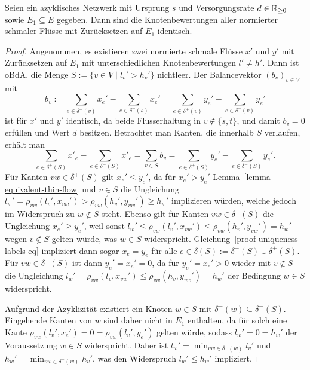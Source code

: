 \begin{lemma}
	Seien ein azyklisches Netzwerk mit Ursprung $s$ und Versorgungsrate $d\in\mathbb{R}_{\geq 0}$ sowie $E_1\subseteq E$ gegeben.
	Dann sind die Knotenbewertungen aller normierter schmaler Flüsse mit Zurücksetzen auf $E_1$ identisch.
\end{lemma}
\begin{proof}
	Angenommen, es existieren zwei normierte schmale Flüsse $x'$ und $y'$ mit Zurück\-setzen auf $E_1$ mit unterschiedlichen Knotenbewertungen $l'\neq h'$.
	Dann ist oBdA. die Menge $S:=\{ v\in V \mid l_v' > h_v' \}$ nichtleer.
	Der Balancevektor $(b_v)_{v\in V}$ mit $$b_v:=\sum_{e\in\delta^+(v)} x_e' - \sum_{e\in\delta^-(s)} x_e' = \sum_{e\in\delta^+(v)} y_e' - \sum_{e\in\delta^-(v)} y_e'$$ ist für $x'$ und $y'$ identisch, da beide Flusserhaltung in $v\notin\{ s, t\}$, und damit $b_v=0$ erfüllen und Wert $d$ besitzen.
	Betrachtet man Kanten, die innerhalb $S$ verlaufen, erhält man 
	\begin{equation}\label{proof-uniqueness-labels-eq}
	\sum_{e\in \delta^+(S)} x'_e - \sum_{e\in\delta^-(S)} x'_e = \sum_{v\in S} b_v = \sum_{e\in\delta^+(S)} y_e' - \sum_{e\in\delta^-(S)} y_e'.
	\end{equation}
	Für Kanten $vw\in \delta^+(S)$ gilt $x_e' \leq y_e'$, da für $x_e' > y_e'$ Lemma~\ref{lemma-equivalent-thin-flow} und $v\in S$ die Ungleichung $l_w' = \rho_{vw}(l_v', x_{vw}') > \rho_{vw}(h_v', y_{vw}')\geq h_w'$ implizieren würden, welche jedoch im Widerspruch zu $w\notin S$ steht.
	Ebenso gilt für Kanten $vw\in\delta^-(S)$ die Ungleichung $x_e' \geq y_e'$, weil sonst $l_w' \leq \rho_{vw}(l_v', x_{vw}') \leq \rho_{vw}(h_v', y_{vw}') = h_w'$ wegen $v\notin S$ gelten würde, was $w\in S$ widerspricht.
	Gleichung~\ref{proof-uniqueness-labels-eq} impliziert dann sogar $x_e = y_e$ für alle $e\in \delta(S):=\delta^-(S) \cup \delta^+(S)$.
	Für $vw\in \delta^-(S)$ ist dann $y_e'=x_e'=0$, da für $y_e'=x_e'>0$ wieder mit $v\notin S$ die Ungleichung $l_w' = \rho_{vw}(l_v, x_{vw}')\leq \rho_{vw}(h_v, y_{vw}')=h_w'$ der Bedingung $w\in S$ widerspricht.
	
	Aufgrund der Azyklizität existiert ein Knoten $w\in S$ mit $\delta^-(w)\subseteq \delta^-(S)$.
	Eingehende Kanten von $w$ sind daher nicht in $E_1$ enthalten, da für solch eine Kante $\rho_{vw}(l_v', x_e') = 0 = \rho_{vw}(l_v', y_e')$ gelten würde, sodass $l_w' = 0 = h_w'$ der Voraussetzung $w\in S$ widerspricht.
	Daher ist $l_w' = \min_{vw\in \delta^-(w)} l_v'$ und $h_w' = \min_{vw\in\delta^-(w)} h_v'$, was den Widerspruch $l_w' \leq h_w'$ impliziert.
\end{proof}


